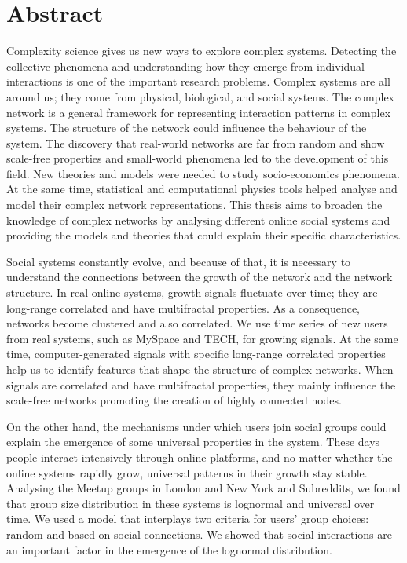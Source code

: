 
\normalsize


\chapter{Abstract}

Complexity science gives us new ways to explore complex systems. Detecting the collective phenomena and understanding how they emerge from individual interactions is one of the important research problems. Complex systems are all around us; they come from physical, biological, and social systems. The complex network is a general framework for representing interaction patterns in complex systems. The structure of the network could influence the behaviour of the system. The discovery that real-world networks are far from random and show scale-free properties and small-world phenomena led to the development of this field. New theories and models were needed to study socio-economics phenomena. At the same time, statistical and computational physics tools helped analyse and model their complex network representations. This thesis aims to broaden the knowledge of complex networks by analysing different online social systems and providing the models and theories that could explain their specific characteristics. 

Social systems constantly evolve, and because of that, it is necessary to understand the connections between the growth of the network and the network structure. In real online systems, growth signals fluctuate over time; they are long-range correlated and have multifractal properties. As a consequence, networks become clustered and also correlated. We use time series of new users from real systems, such as MySpace and  TECH, for growing signals. At the same time, computer-generated signals with specific long-range correlated properties help us to identify features that shape the structure of complex networks. When signals are correlated and have multifractal properties, they mainly influence the scale-free networks promoting the creation of highly connected nodes.

On the other hand, the mechanisms under which users join social groups could explain the emergence of some universal properties in the system. These days people interact intensively through online platforms, and no matter whether the online systems rapidly grow, universal patterns in their growth stay stable. Analysing the Meetup groups in London and New York and Subreddits, we found that group size distribution in these systems is lognormal and universal over time. We used a model that interplays two criteria for users' group choices: random and based on social connections. We showed that social interactions are an important factor in the emergence of the lognormal distribution.

